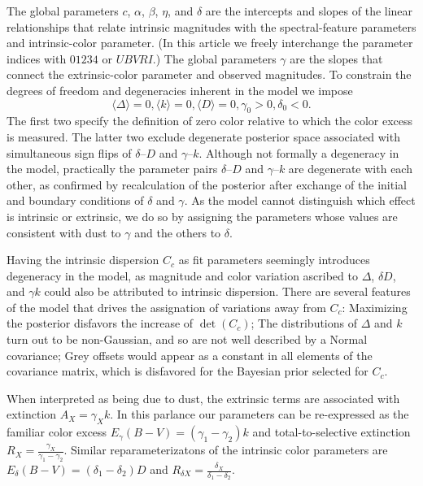 \documentclass{aastex}   	%
\begin{document}
The global parameters $c$, $\alpha$, $\beta$, $\eta$, and $\delta$  are the intercepts and slopes of the linear relationships that
relate intrinsic magnitudes with the spectral-feature parameters and intrinsic-color parameter.
(In this article we freely interchange the parameter indices with  $01234$ or $UBVRI$.)
The global parameters $\gamma$ are the slopes that connect the extrinsic-color
parameter and observed magnitudes.  To constrain the degrees of freedom and degeneracies inherent in the model we impose
\begin{equation}
\langle \Delta \rangle=0, \langle k \rangle=0, \langle D \rangle=0, \gamma_0 > 0, \delta_0 < 0.
\end{equation}
The first two specify the definition of zero color relative to which the color excess is measured.    The latter two exclude degenerate posterior space
associated
with  simultaneous sign flips of
$\delta$--$D$ and $\gamma$--$k$.
Although not formally a degeneracy in the model, practically the parameter pairs  $\delta$--$D$ and $\gamma$--$k$ are degenerate with
each other,
as confirmed by recalculation of the posterior after exchange of the initial  and boundary conditions of $\delta$ and $\gamma$.
As the model cannot distinguish which effect is intrinsic or extrinsic, we do so
by assigning the parameters whose values are consistent with dust to $\gamma$ and the others to $\delta$.


Having the intrinsic dispersion $C_c$ as fit parameters seemingly introduces degeneracy in the model, as magnitude and color variation
ascribed to $\Delta$, $\delta D$, and $\gamma k$ could also be attributed to intrinsic dispersion.  There are several features of the model
that drives the assignation of variations away from $C_c$:  Maximizing the posterior disfavors the increase of $\det{(C_c)}$;
The distributions of $\Delta$ and $k$ turn out to
be non-Gaussian, and so are not well described by a Normal covariance; Grey offsets would appear as a constant
in all elements of the covariance matrix, which is disfavored for the Bayesian prior selected for $C_c$.

When interpreted as being due to dust, the extrinsic terms are associated with extinction $A_X = \gamma_X k$.  In
this parlance our parameters can be re-expressed as the  familiar color excess
$E_\gamma(B-V) = (\gamma_1-\gamma_2) k$ and total-to-selective extinction $R_X = \frac{\gamma_X}{\gamma_1-\gamma_2}$.
Similar reparameterizatons of the intrinsic color parameters are
$E_\delta(B-V) = (\delta_1-\delta_2) D$ and $R_{\delta X} = \frac{\delta_X}{\delta_1-\delta_2}$.
\end{document}
